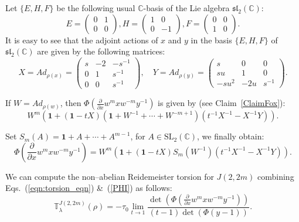 \documentclass[a4paper]{amsart}
\theoremstyle{plain}
\theoremstyle{definition}
\theoremstyle{remark}
\newcommand{\C}{{\mathbb C}}
\newcommand{\CC}{{\mathbb C}}
\newcommand{\I}{\mathbf{1}}
\newcommand{\SL}{{\mathrm{SL}_2(\C)}}
\newcommand{\sll}{\mathfrak{sl}_2(\CC)}
\begin{document}
Let $\{E, H, F\}$ be the following usual $\CC$-basis of the Lie algebra $\sll$: 
\[
E=
\left(
\begin{array}{cc}
0 & 1 \\
0 & 0
\end{array}
\right),
H=
\left(
\begin{array}{cc}
1 & 0 \\
0 & -1
\end{array}
\right),
F=
\left(
\begin{array}{cc}
0 & 0 \\
1 & 0
\end{array}
\right).
\]
It is easy to see that the adjoint actions of $x$ and $y$ in the basis $\{ E, H, F \}$ of $\sll$ are given by the following matrices:
\[
X = Ad_{\rho(x)} =
\left(
\begin{array}{ccc}
 s & -2 & -s^{-1} \\
 0 & 1 & s^{-1} \\
 0 & 0 & s^{-1}
\end{array}
\right),\quad
Y = Ad_{\rho(y)} =
\left(
\begin{array}{ccc}
 s & 0 & 0 \\
 su & 1 & 0 \\
 -su^2 & -2u & s^{-1}
\end{array}
\right).
\]

If $W = Ad_{\rho(w)}$, then $\Phi(\frac{\partial}{\partial x}w^m  x w^{-m} y^{-1})$ is given by (see Claim~\ref{ClaimFox}):
\[
W^m 
\left(\I + (\I - tX)(\I+ W^{-1} +\cdots +W^{-m+1})(t^{-1}X^{-1}-X^{-1}Y)\right).
\]

Set $S_m(A) = \I  + A + \cdots + A^{m-1}$, for $A \in \SL$, we finally obtain: 
\begin{equation}\label{PHI}
\Phi(\frac{\partial}{\partial x}w^m  x w^{-m} y^{-1}) = W^m
\left(
\I +(\I -tX)S_m(W^{-1})(t^{-1}X^{-1} - X^{-1}Y)
\right).
\end{equation}

We can compute 
the non--abelian Reidemeister torsion for $J(2, 2m)$ 
combining Eqs.~(\ref{eqn:torsion_eqn}) \&~(\ref{PHI}) as follows: 
\begin{equation*}
{\mathbb T}^{J(2, 2m)}_{\lambda}(\rho)
=
-\tau_0
\lim_{t \to 1}
\frac{\det ( \Phi(\frac{\partial}{\partial x}w^m  x w^{-m} y^{-1})) }
            {(t-1)\det ( \Phi(y-1))}.
\end{equation*}
\end{document}
